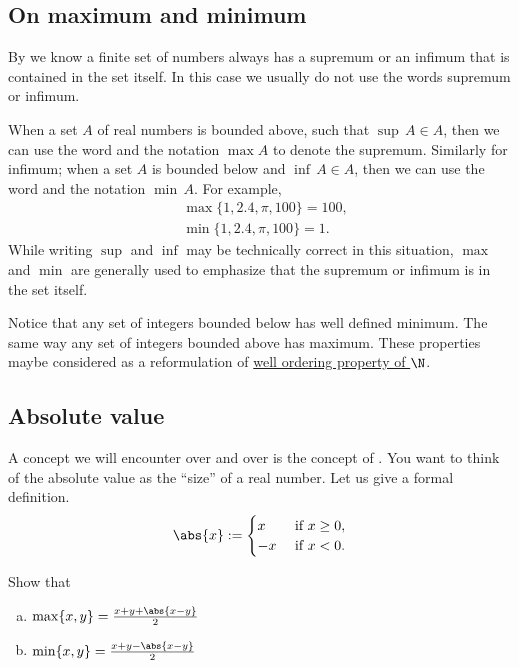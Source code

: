 \documentclass[12pt]{book}
\begin{document}
\subsection*{On maximum and minimum}

By  we know 
a finite set of numbers always has a supremum or an infimum that is contained
in the set itself.
In this case we usually do not use the words
supremum or infimum.

When a set $A$ of real numbers is bounded above,
such that 
$\sup\, A \in A$, then we can use the word
\emph{} and the notation $\max A$ to denote the supremum.
Similarly for infimum; when a set $A$ is bounded below
and $\inf\, A \in A$, then we can use the
word \emph{} and the notation $\min\, A$.
For example,
\begin{align*}
& \max \{ 1,2.4,\pi,100 \} = 100 , \\
& \min \{ 1,2.4,\pi,100 \} = 1 .
\end{align*}
While writing $\sup$ and $\inf$ may be technically
correct in this situation, $\max$ and
$\min$ are generally used to emphasize that the supremum or infimum
is in the set itself.

Notice that any set of integers bounded below has well defined  minimum.
The same way any set of integers bounded above has maximum.
These properties maybe considered as a reformulation of \hyperref[wop]{well ordering property of $\N$}. 

\subsection*{Absolute value} \label{sec:absval}


A concept we will encounter over and over is the concept of
\emph{}.
You want to think of the absolute value as the ``size'' of a real number.
Let us give a formal definition.
\begin{equation*}
\abs{x} :=
\begin{cases}
x & \text{ if $x \geq 0$}, \\
-x & \text{ if $x < 0$} .
\end{cases}
\end{equation*}

\begin{exercise}
Show that
\begin{enumerate}[a)]
\item
$\max \{x,y\} = \frac{x+y+\abs{x-y}}{2}$
\item
$\min \{x,y\} = \frac{x+y-\abs{x-y}}{2}$
\end{enumerate}
\end{exercise}
\end{document}
